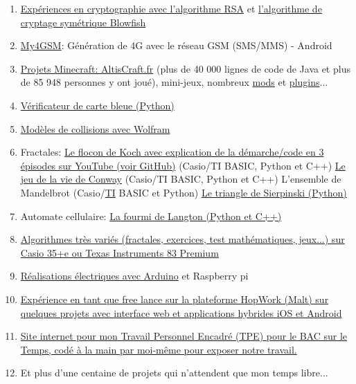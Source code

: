 \documentclass{article}
\begin{document}
\begin{enumerate}
			\item \href{https://github.com/Benjamin-Loison/C--projects/blob/master/main.cpp}{Expériences en cryptographie avec l'algorithme RSA} et \href{https://github.com/Benjamin-Loison/Lot-of-Java-projects/tree/master/Hash\%20password\%20database}{l'algorithme de cryptage symétrique Blowfish}
			\item \href{https://github.com/Benjamin-Loison/Lot-of-Java-projects/tree/master/My4GGSM}{My4GSM}: Génération de 4G avec le réseau GSM (SMS/MMS) - Android
			\item \href{https://github.com/Benjamin-Loison/AltisCraft.fr}{Projets Minecraft: AltisCraft.fr} (plus de 40 000 lignes de code de Java et plus de 85 948 personnes y ont joué), mini-jeux, nombreux \href{https://github.com/Benjamin-Loison/Lot-of-Java-projects/blob/master/Minecraft\%20mods\%20and\%20plugins.zip}{mods} et \href{https://github.com/Benjamin-Loison/Azziz-Plugin-MC-Mini-Games}{plugins}...
			\item \href{https://github.com/Benjamin-Loison/Verificateur-de-carte-bancaire}{Vérificateur de carte bleue (Python)}
			\item \href{https://github.com/Benjamin-Loison/Wolfram-Collision}{Modèles de collisions avec Wolfram}
			\item Fractales:
				\subitem \href{https://github.com/Benjamin-Loison/Koch-snowflake}{Le flocon de Koch avec explication de la démarche/code en 3 épisodes sur YouTube (voir GitHub)} (Casio/TI BASIC, Python et C++)
				\subitem \href{https://github.com/Benjamin-Loison/Conway-game-of-life}{Le jeu de la vie de Conway} (Casio/TI BASIC, Python et C++)
				\subitem L'ensemble de Mandelbrot (Casio/\href{https://github.com/Benjamin-Loison/BASIC-algorithms-calculators-/tree/master/MANDELBR}{TI} BASIC et Python)
				\subitem \href{https://github.com/Benjamin-Loison/Sierpinski-s-triangle}{Le triangle de Sierpinski (Python)}
			\item Automate cellulaire:
				\subitem \href{https://github.com/Benjamin-Loison/Langton-s-ant}{La fourmi de Langton (Python et C++)}
			\item \href{https://github.com/Benjamin-Loison/BASIC-algorithms-calculators-}{Algorithmes très variés (fractales, exercices, test mathématiques, jeux...) sur Casio 35+e ou Texas Instruments 83 Premium}
			\item \href{https://github.com/Benjamin-Loison/ArduinoFun}{Réalisations électriques avec Arduino} et Raspberry pi
			\item \href{https://github.com/Benjamin-Loison/FreeLance}{Expérience en tant que free lance sur la plateforme HopWork (Malt) sur quelques projets avec interface web et applications hybrides iOS et Android}
			\item \href{https://github.com/Benjamin-Loison/Travaux-Personnel-Encadr-s-TPE---BAC-}{Site internet pour mon Travail Personnel Encadré (TPE) pour le BAC sur le Temps, codé à la main par moi-même pour exposer notre travail.}
			\item Et plus d'une centaine de projets qui n'attendent que mon temps libre...
			
		\end{enumerate}
\end{document}

